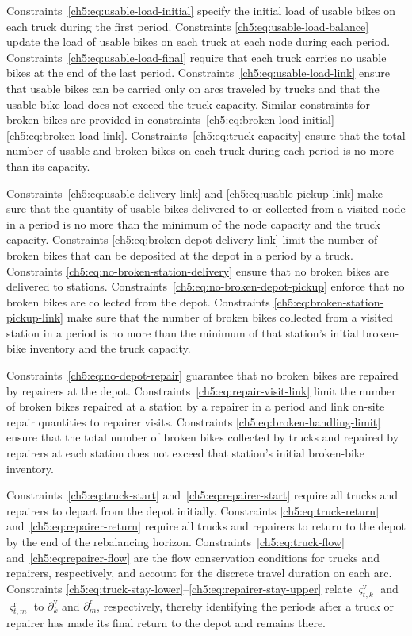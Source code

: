 Constraints~\eqref{ch5:eq:usable-load-initial} specify the initial load of usable
bikes on each truck during the first period. Constraints
\eqref{ch5:eq:usable-load-balance} update the load of usable bikes on each truck at
each node during each period. Constraints~\eqref{ch5:eq:usable-load-final} require
that each truck carries no usable bikes at the end of the last period.
Constraints~\eqref{ch5:eq:usable-load-link} ensure that usable bikes can be carried
only on arcs traveled by trucks and that the usable-bike load does not exceed the
truck capacity. Similar constraints for broken bikes are provided in
constraints~\eqref{ch5:eq:broken-load-initial}--\eqref{ch5:eq:broken-load-link}.
Constraints~\eqref{ch5:eq:truck-capacity} ensure that the total number of usable and
broken bikes on each truck during each period is no more than its capacity.

Constraints~\eqref{ch5:eq:usable-delivery-link} and
\eqref{ch5:eq:usable-pickup-link} make sure that the quantity of usable bikes
delivered to or collected from a visited node in a period is no more than the
minimum of the node capacity and the truck capacity. Constraints
\eqref{ch5:eq:broken-depot-delivery-link} limit the number of broken bikes that can
be deposited at the depot in a period by a truck. Constraints
\eqref{ch5:eq:no-broken-station-delivery} ensure that no broken bikes are delivered
to stations. Constraints~\eqref{ch5:eq:no-broken-depot-pickup} enforce that no
broken bikes are collected from the depot. Constraints
\eqref{ch5:eq:broken-station-pickup-link} make sure that the number of broken bikes
collected from a visited station in a period is no more than the minimum of that
station's initial broken-bike inventory and the truck capacity.

Constraints~\eqref{ch5:eq:no-depot-repair} guarantee that no broken bikes are
repaired by repairers at the depot. Constraints~\eqref{ch5:eq:repair-visit-link}
limit the number of broken bikes repaired at a station by a repairer in a period
and link on-site repair quantities to repairer visits. Constraints
\eqref{ch5:eq:broken-handling-limit} ensure that the total number of broken bikes
collected by trucks and repaired by repairers at each station does not exceed
that station's initial broken-bike inventory.

Constraints~\eqref{ch5:eq:truck-start} and~\eqref{ch5:eq:repairer-start} require all
trucks and repairers to depart from the depot initially. Constraints
\eqref{ch5:eq:truck-return} and~\eqref{ch5:eq:repairer-return} require all trucks and
repairers to return to the depot by the end of the rebalancing horizon.
Constraints~\eqref{ch5:eq:truck-flow} and~\eqref{ch5:eq:repairer-flow} are the flow
conservation conditions for trucks and repairers, respectively, and account for
the discrete travel duration on each arc. Constraints
\eqref{ch5:eq:truck-stay-lower}--\eqref{ch5:eq:repairer-stay-upper} relate
$\varsigma_{t,k}^{\mathrm{v}}$ and $\varsigma_{t,m}^{\mathrm{r}}$ to
$\partial_k^{\mathrm{v}}$ and $\partial_m^{\mathrm{r}}$, respectively, thereby
identifying the periods after a truck or repairer has made its final return to
the depot and remains there.

